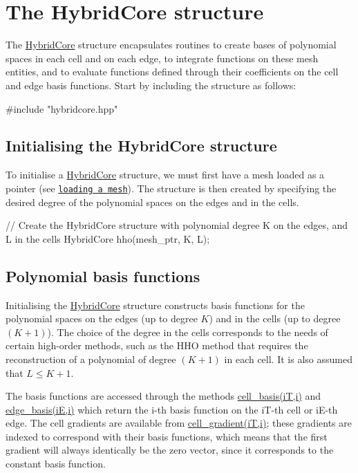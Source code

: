 \label{_hybridcore}%
 \hypertarget{index_hybridcore}{}\section{The Hybrid\+Core structure}\label{index_hybridcore}
The \hyperlink{classHArDCore2D_1_1HybridCore}{Hybrid\+Core} structure encapsulates routines to create bases of polynomial spaces in each cell and on each edge, to integrate functions on these mesh entities, and to evaluate functions defined through their coefficients on the cell and edge basis functions. Start by including the structure as follows\+:


\begin{DoxyCode}
\textcolor{preprocessor}{#include "hybridcore.hpp"}
\end{DoxyCode}
\hypertarget{index_init_core}{}\subsection{Initialising the Hybrid\+Core structure}\label{index_init_core}
To initialise a \hyperlink{classHArDCore2D_1_1HybridCore}{Hybrid\+Core} structure, we must first have a mesh loaded as a pointer (see \href{#loading_mesh}{\tt loading a mesh}). The structure is then created by specifying the desired degree of the polynomial spaces on the edges and in the cells.


\begin{DoxyCode}
\textcolor{comment}{// Create the HybridCore structure with polynomial degree K on the edges, and L in the cells}
  HybridCore hho(mesh\_ptr, K, L);
\end{DoxyCode}


\label{_basis}%
 \hypertarget{index_basis}{}\subsection{Polynomial basis functions}\label{index_basis}
Initialising the \hyperlink{classHArDCore2D_1_1HybridCore}{Hybrid\+Core} structure constructs basis functions for the polynomial spaces on the edges (up to degree $K$) and in the cells (up to degree $(K+1)$). The choice of the degree in the cells corresponds to the needs of certain high-\/order methods, such as the H\+HO method that requires the reconstruction of a polynomial of degree $(K+1)$ in each cell. It is also assumed that $L\le K+1$.

The basis functions are accessed through the methods \hyperlink{classHArDCore2D_1_1HybridCore_a34242db07cc2b3c3b867d9e4580b634d}{cell\+\_\+basis(iT,i)} and \hyperlink{classHArDCore2D_1_1HybridCore_a6b4feaeef7739a2e30fcf6c601fcf721}{edge\+\_\+basis(iE,i)} which return the i-\/th basis function on the i\+T-\/th cell or i\+E-\/th edge. The cell gradients are available from \hyperlink{classHArDCore2D_1_1HybridCore_a710fc23b914623b90a2699ab4291e539}{cell\+\_\+gradient(iT,i)}; these gradients are indexed to correspond with their basis functions, which means that the first gradient will always identically be the zero vector, since it corresponds to the constant basis function.


